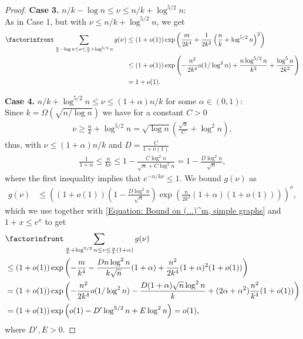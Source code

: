 \documentclass[12pt]{article}
\newcommand{\1}{\mathds{1}}
\begin{document}
\begin{proof}
    \textbf{Case 3.} $n/k-\log n\le \nu \le n/k+\log ^{5/2}n$: \hfill \\
    As in Case 1, but with $\nu \le n/k + \log ^{5/2}n$, we get
    \begin{align*}
        \factorinfront\sum_{\frac{n}{k}-\log n\le \nu \le \frac{n}{k}+\log ^{5/2}n} g(\nu) &\le (1+o(1))\exp\left(\frac{m}{2k^4}+\frac{1}{2k^2}\left(\frac{n}{k}+\log^{5/2}n\right)^2\right) \\
        &\le (1+o(1))\exp\left(-\frac{n^2}{2k^4}o(1/\log ^2n)+\frac{n\log^{5/2}n}{k^3}+\frac{\log ^5n}{2k^2}\right) \\
        &=1+o(1).
    \end{align*}

    \vspace{\baselineskip}

    \textbf{Case 4.} $n/k+\log^{5/2}n\le \nu \le (1+\alpha)n/k$ for some $\alpha\in (0,1)$: \hfill \\
    Since $k=\Omega(\sqrt{n/\log n})$ we have for a constant $C>0$
    \begin{align*}
        \nu\geq \frac{n}{k}+\log^{5/2}n  %
	=\sqrt{\log n}\left(\frac{\sqrt{n}}{C}+\log^2n\right),
    \end{align*}
    thus, with $\nu\leq (1+\alpha)n/k$ and $D=\frac{C}{1+o(1)}$
    \begin{align*}
        \frac{1}{1+\alpha}\le \frac{n}{k\nu} 
        \leq 
        1-\frac{C\log^2n}{\sqrt{n}+C\log^2n}=1-\frac{D\log^2n}{\sqrt{n}},
    \end{align*}
    where the first inequality implies that $e^{-n/k\nu}\leq 1$. We bound $g(\nu)$ as
    \begin{align*}
        g(\nu)&\leq 
        \left( (1+o(1))\left(1-\frac{D\log^2n}{\sqrt{n}}\right)\exp\left(\frac{n}{2k^3}(1+\alpha)(1+o(1))\right)\right)^\nu,
    \end{align*}
    which we use together with \eqref{Equation: Bound on (...)^m, simple graphs} and $1+x\leq e^x$ to get
    \begin{align*}
        &\factorinfront \sum_{\frac{n}{k}+\log^{5/2}n\le \nu \le \frac{n}{k}(1+\alpha)}g(\nu) \\
        &\leq(1+o(1))\exp\left(-\frac{m}{k^4}-\frac{D n \log^2n}{k \sqrt{n}} (1+\alpha)+\frac{n^2}{2k^4}(1+\alpha)^2(1+o(1))\right) \\
        &=(1+o(1))\exp\left( -\frac{n^2}{2k^4}o(1/\log^2n) -\frac{D(1+\alpha)\sqrt{n}\log^2n}{k} +(2\alpha+\alpha^2)\frac{n^2}{k^4}(1+o(1))\right) \\
        &=(1+o(1))\exp\left(o(1)-D'\log^{5/2}n+E\log^2n\right)
        =o(1),
    \end{align*}
    where $D',E>0$.


\end{proof}
\end{document}
